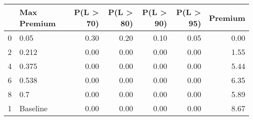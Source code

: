 \begin{tabular}{llrrrrr}
\toprule
{} & Max Premium &  P(L > 70) &  P(L > 80) &  P(L > 90) &  P(L > 95) &  Premium \\
\midrule
0 &        0.05 &       0.30 &       0.20 &       0.10 &       0.05 &     0.00 \\
2 &       0.212 &       0.00 &       0.00 &       0.00 &       0.00 &     1.55 \\
4 &       0.375 &       0.00 &       0.00 &       0.00 &       0.00 &     5.44 \\
6 &       0.538 &       0.00 &       0.00 &       0.00 &       0.00 &     6.35 \\
8 &         0.7 &       0.00 &       0.00 &       0.00 &       0.00 &     5.89 \\
1 &    Baseline &       0.00 &       0.00 &       0.00 &       0.00 &     8.67 \\
\bottomrule
\end{tabular}
